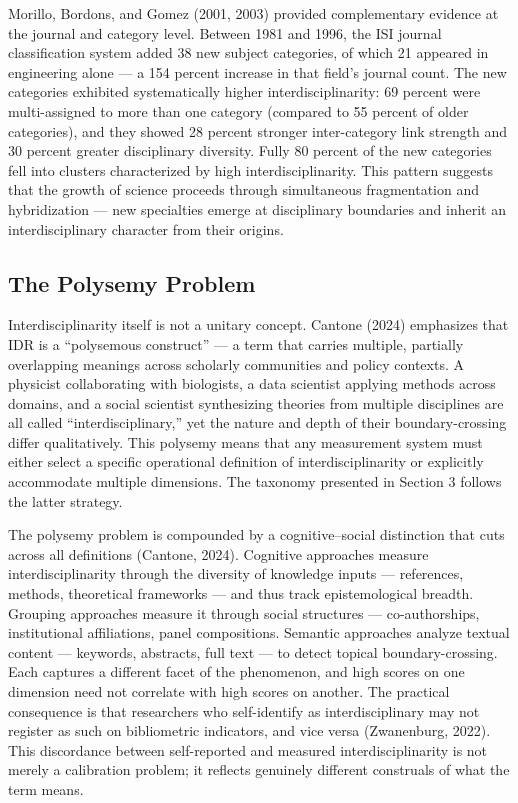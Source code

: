 \documentclass[
]{article}
\begin{document}
Morillo, Bordons, and Gomez (2001, 2003) provided complementary evidence
at the journal and category level. Between 1981 and 1996, the ISI
journal classification system added 38 new subject categories, of which
21 appeared in engineering alone --- a 154 percent increase in that
field's journal count. The new categories exhibited systematically
higher interdisciplinarity: 69 percent were multi-assigned to more than
one category (compared to 55 percent of older categories), and they
showed 28 percent stronger inter-category link strength and 30 percent
greater disciplinary diversity. Fully 80 percent of the new categories
fell into clusters characterized by high interdisciplinarity. This
pattern suggests that the growth of science proceeds through
simultaneous fragmentation and hybridization --- new specialties emerge
at disciplinary boundaries and inherit an interdisciplinary character
from their origins.

\hypertarget{the-polysemy-problem}{%
\subsection{The Polysemy Problem}\label{the-polysemy-problem}}

Interdisciplinarity itself is not a unitary concept. Cantone (2024)
emphasizes that IDR is a ``polysemous construct'' --- a term that
carries multiple, partially overlapping meanings across scholarly
communities and policy contexts. A physicist collaborating with
biologists, a data scientist applying methods across domains, and a
social scientist synthesizing theories from multiple disciplines are all
called ``interdisciplinary,'' yet the nature and depth of their
boundary-crossing differ qualitatively. This polysemy means that any
measurement system must either select a specific operational definition
of interdisciplinarity or explicitly accommodate multiple dimensions.
The taxonomy presented in Section 3 follows the latter strategy.

The polysemy problem is compounded by a cognitive--social distinction
that cuts across all definitions (Cantone, 2024). Cognitive approaches
measure interdisciplinarity through the diversity of knowledge inputs
--- references, methods, theoretical frameworks --- and thus track
epistemological breadth. Grouping approaches measure it through social
structures --- co-authorships, institutional affiliations, panel
compositions. Semantic approaches analyze textual content --- keywords,
abstracts, full text --- to detect topical boundary-crossing. Each
captures a different facet of the phenomenon, and high scores on one
dimension need not correlate with high scores on another. The practical
consequence is that researchers who self-identify as interdisciplinary
may not register as such on bibliometric indicators, and vice versa
(Zwanenburg, 2022). This discordance between self-reported and measured
interdisciplinarity is not merely a calibration problem; it reflects
genuinely different construals of what the term means.
\end{document}
